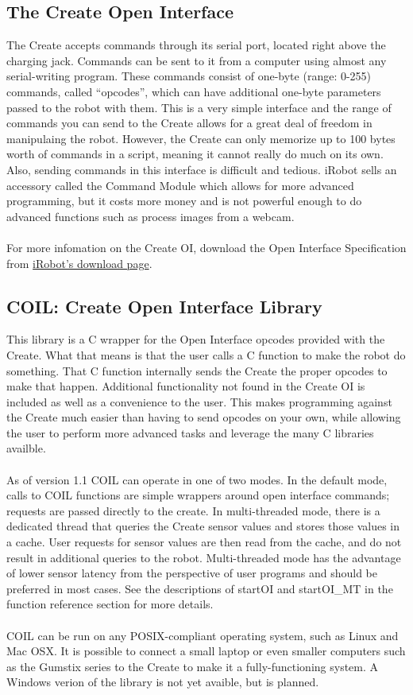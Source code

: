 \documentclass {article}
\begin{document}
\subsection {The Create Open Interface}
The Create accepts commands through its serial port, located right
above the charging jack.  Commands can be sent to it from a computer
using almost any serial-writing program.  These commands consist of
one-byte (range: 0-255) commands, called ``opcodes'', which can have
additional one-byte parameters passed to the robot with them.  This is
a very simple interface and the range of commands you can send to the
Create allows for a great deal of freedom in manipulaing the robot.
However, the Create can only memorize up to 100 bytes worth of
commands in a script, meaning it cannot really do much on its own.
Also, sending commands in this interface is difficult and tedious.
iRobot sells an accessory called the Command Module which allows for
more advanced programming, but it costs more money and is not powerful
enough to do advanced functions such as process images from a
webcam. \\
\\
For more infomation on the Create OI, download the Open Interface
Specification from
\href{http://www.irobot.com/sp.cfm?pageid=294}{iRobot's download
  page}.

\subsection {COIL: Create Open Interface Library}
This library is a C wrapper for the Open Interface opcodes provided
with the Create.  What that means is that the user calls a C function
to make the robot do something.  That C function internally sends the
Create the proper opcodes to make that happen.  Additional
functionality not found in the Create OI is included as well as a
convenience to the user.  This makes programming against the Create
much easier than having to send opcodes on your own, while allowing
the user to
perform more advanced tasks and leverage the many C libraries availble. \\
\\
As of version 1.1 COIL can operate in one of two modes.  In the
default mode, calls to COIL functions are simple wrappers around open
interface commands; requests are passed directly to the create.  In
multi-threaded mode, there is a dedicated thread that queries the
Create sensor values and stores those values in a cache.  User
requests for sensor values are then read from the cache, and do not
result in additional queries to the robot.  Multi-threaded mode has
the advantage of lower sensor latency from the perspective of user
programs and should be preferred in most cases.  See the descriptions
of startOI and startOI\_MT in the function reference section for more
details.\\ 
\\
COIL can be run on any POSIX-compliant operating system, such as Linux
and Mac OSX.  It is possible to connect a small laptop or even smaller
computers such as the Gumstix series to the Create to make it a
fully-functioning system.  A Windows verion of the library is not yet
avaible, but is planned.
\end{document}
